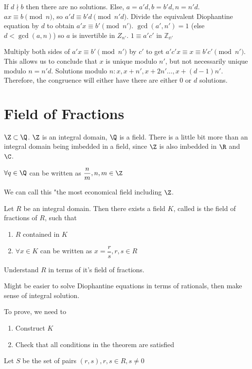 \documentclass[10pt]{article}
\begin{document}
If $d \nmid b$ then there are no solutions. Else, $a = a'd, b = b'd, n = n'd$. $ax \equiv b \pmod{n}$, so $a'd \equiv b'd \pmod{n'd}$. Divide the equivalent Diophantine equation by $d$ to obtain $a'x \equiv b' \pmod{n'}$. $\gcd(a', n') = 1$ (else $d < \gcd(a, n)$) so $a$ is invertible in $Z_{n'}$. $1 \equiv a'c'$ in $\mathbb{Z_{n'}}$


Multiply both sides of $a'x \equiv b' \pmod{n'}$ by $c'$ to get $a'c'x \equiv x \equiv b'c' \pmod{n'}$. This allows us to conclude that $x$ is unique modulo $n'$, but not necessarily unique modulo $n = n'd$. Solutions modulo $n: x, x + n', x + 2n' \ldots, x + (d-1)n'$. Therefore, the congruence will either have there are either 0 or $d$ solutions.

\section{Field of Fractions}
$\Z \subset \Q$. $\Z$ is an integral domain, $\Q$ is a field. There is a little bit more than an integral domain being imbedded in a field, since $\Z$ is also imbedded in $\R$ and $\C$. 

\begin{rmk}
    $\forall q\in \Q$ can be written as $\dfrac{n}{m}, n, m \in \Z$
\end{rmk}
We can call this "the most economical field including $\Z$.

\begin{thm}
    Let $R$ be an integral domain. Then there exists a field $K$, called is the field of fractions of $R$, such that 
    \begin{enumerate}
        \item $R$ contained in $K$
        \item $\forall x\in K$ can be written as $x = \dfrac{r}{s}, r , s\in R$
    \end{enumerate}
\end{thm}
Understand $R$ in terms of it's field of fractions. 

Might be easier to solve Diophantine equations in terms of rationals, then make sense of integral solution.

To prove, we need to 
\begin{enumerate}
    \item Construct $K$ 
    \item Check that all conditions in the theorem are satisfied
\end{enumerate}

Let $S$ be the set of pairs $(r, s), r, s \in R, s\neq 0$
\end{document}
